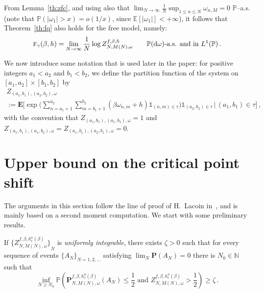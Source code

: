 \documentclass[AHL,Unicode,longabstracts]{cedram}
\newcommand{\gb}{\beta}
\newcommand{\go}{\omega}
\newcommand{\unbf}%
{\mathds{1}}
\newcommand{\dd}{\mathrm{d}}
\newcommand{\tf}{\textsc{f}} %
\newcommand{\bP}{\ensuremath{\mathbf{P}}}
\newcommand{\bE}{\ensuremath{\mathbf{E}}}
\newcommand{\bbE}{\ensuremath{\mathbb{E}}}
\newcommand{\bbN}{\ensuremath{\mathbb{N}}}
\newcommand{\bbP}{\ensuremath{\mathbb{P}}}
\begin{document}
From Lemma~\ref{th:zfc}, and using also that $\lim_{N\to\infty} \frac1N \sup_{1\leq n\leq N} \go_{n,M} = 0$ $\bbP$--a.s. (note that $\bbP(|\go_1|>x) =o(1/x)$, since $\bbE[|\go_1|]<+\infty$), it follows that Theorem~\ref{th:fq} also holds for the free model, namely:
\begin{equation}\label{eq:saf.2}
\tf_{\gamma}(\beta,h) =\lim_{N\to\infty} \frac{1}{N} \log Z^{f,\gb,h}_{N,M(N),\omega} \qquad \bbP(\dd \go)\text{-a.s. and in } L^1(\bbP)\,.
\end{equation}

\goodbreak
We now introduce some notation that is used later in the paper: for positive integers $a_1 < a_2$ and $b_1 < b_2$, we define the partition function of the system on $[a_1,a_2] \times [b_1,b_2]$ by
\begin{multline}\label{eq:pp}
Z_{(a_1,b_1),(a_2,b_2),\omega}\\
:= \bE \bigg[\exp \bigg(\sum_{n=a_1+1}^{a_2} \sum_{m=b_1+1}^{b_2} (\beta \omega_{n,m} +h) \unbf_{(n,m) \in \tau} \bigg) \unbf_{(a_2,b_2)\in \tau}\,\bigg|\,(a_1,b_1) \in \tau \bigg]\,,
\end{multline}
with the convention that $Z_{(a_1,b_1),(a_1,b_1),\omega} = 1$ and $ Z_{(a_1,b_1),(a_1,b_2),\omega}= Z_{(a_1,b_1),(a_2,b_1),\omega}=0$.



\section{Upper bound on the critical point shift}\label{sec:irrel}

The arguments in this section follow the line of proof of H.~Lacoin in~\cite{cf:Lac}, and is mainly based on a second moment computation. We start with some preliminary results.

\begin{prop}\label{th:unint1}
If ${ \lbrace {Z^{f,\gb,h_c^{a}(\gb)}_{N,M(N),\omega}} \rbrace}_N$ is \emph{uniformly integrable}, there exists $\zeta >0$ such that for every sequence of events $\{A_N\}_{N=1, 2, \ldots}$ satisfying $\lim_{N} \bP(A_N)=0$ there is $N_0\in \bbN $ such that
\begin{equation}\label{eq:unint1}
\inf_{N \ge N_0}
\bbP \left(\bP^{f,\gb,h_c^{a}(\gb)}_{N,M(N),\omega} (A_N)\le \frac{1}{2}
\text{ and } Z^{f,\gb,h_c^{a}(\gb)}_{N,M(N),\omega} > \frac{1}{2} \right) \ge\zeta\,.
\end{equation}
\end{prop}
\end{document}
